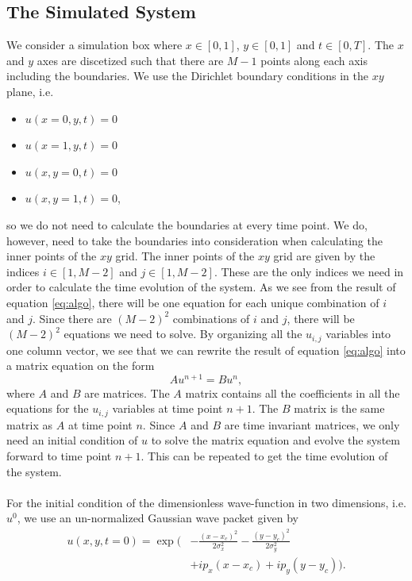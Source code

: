 \documentclass[english,notitlepage,reprint,nofootinbib]{revtex4-2}  %
\begin{document}
	\subsection{The Simulated System}
	\noindent
	We consider a simulation box where $x \in [0,1]$, $y \in [0,1]$ and $t \in [0,T]$. The $x$ and $y$ axes are discetized such
	that there are $M-1$ points along each axis including the boundaries.
	We use the Dirichlet boundary conditions in the $xy$ plane, i.e.
	\begin{itemize}
		\item $u(x=0, y, t) = 0$
		\item $u(x=1, y, t) = 0$
		\item $u(x, y=0, t) = 0$ 
		\item $u(x, y=1, t) = 0$,
	\end{itemize}
	so we do not need to calculate the boundaries at every time point. We do, however, need 
	to take the boundaries into consideration when calculating the inner points of the $xy$ grid.
	The inner points of the $xy$ grid are given by the indices $i \in [1,M-2]$ and 
	$j \in [1,M-2]$. These are the only indices we need in order to
	calculate the time evolution of the system.	As we see from the result of equation \ref{eq:algo},
	there will be one equation for each unique combination of $i$ and $j$.
	Since there are $(M-2)^2$ combinations of $i$ and $j$, there will be 
	$(M-2)^2$ equations we need to solve.  
	By organizing all the $u_{i,j}$ variables into one column vector, 
	we see that we can rewrite the result of equation \ref{eq:algo} into
	a matrix equation on the form 
	\begin{equation}\label{eq:matrix equation}
		Au^{n+1} = Bu^n,	
	\end{equation} 	
	where $A$ and $B$ are matrices. The $A$ matrix contains all the coefficients in all the equations
	for the $u_{i,j}$ variables at time point $n+1$. The $B$ matrix is the same matrix as $A$ at time point $n$.
	Since $A$ and $B$ are time invariant matrices,
	we only need an initial condition of $u$ to solve the matrix equation and evolve the system forward to
	time point $n+1$. This can be repeated to get the time evolution of the system.\\ \\
	\noindent
	For the initial condition of the dimensionless wave-function in two dimensions,
	i.e. $u^{0}$, we use an un-normalized Gaussian wave packet given by
	\begin{equation}\label{eq:wave packet}
	\begin{split}
		u(x,y,t=0) = \exp\Big(&-\frac{(x-x_c)^2}{2 \sigma_x^2} - \frac{(y-y_c)^2}{2 \sigma_y^2} \\
		&+ i p_x (x-x_c) + i p_y (y-y_c)\Big). \\
	\end{split}
	\end{equation}
\end{document}

